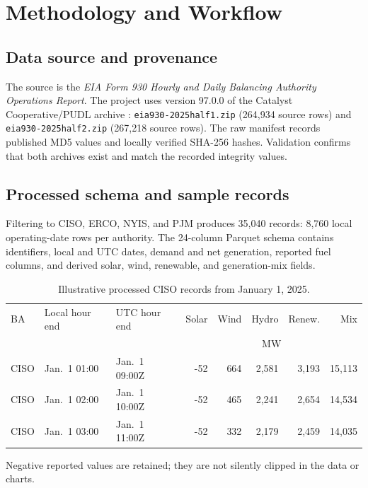 \documentclass[11pt]{article}
\begin{document}
\section{Methodology and Workflow}
\subsection{Data source and provenance}
The source is the \textit{EIA Form 930 Hourly and Daily Balancing Authority Operations Report}. The project uses version 97.0.0 of the Catalyst Cooperative/PUDL archive \citep{pudl-zenodo}: \texttt{eia930-2025half1.zip} (264,934 source rows) and \texttt{eia930-2025half2.zip} (267,218 source rows). The raw manifest records published MD5 values and locally verified SHA-256 hashes. Validation confirms that both archives exist and match the recorded integrity values.

\subsection{Processed schema and sample records}
Filtering to CISO, ERCO, NYIS, and PJM produces 35,040 records: 8,760 local operating-date rows per authority. The 24-column Parquet schema contains identifiers, local and UTC dates, demand and net generation, reported fuel columns, and derived solar, wind, renewable, and generation-mix fields.

\begin{table}[H]
\centering
\caption{Illustrative processed CISO records from January 1, 2025.}
\label{tab:samples}
\small
\begin{tabular}{l l l r r r r r}
\toprule
BA & Local hour end & UTC hour end & Solar & Wind & Hydro & Renew. & Mix \\
 & & & \multicolumn{5}{c}{MW} \\
\midrule
CISO & Jan.\ 1 01:00 & Jan.\ 1 09:00Z & -52 & 664 & 2,581 & 3,193 & 15,113 \\
CISO & Jan.\ 1 02:00 & Jan.\ 1 10:00Z & -52 & 465 & 2,241 & 2,654 & 14,534 \\
CISO & Jan.\ 1 03:00 & Jan.\ 1 11:00Z & -52 & 332 & 2,179 & 2,459 & 14,035 \\
\bottomrule
\end{tabular}
\end{table}

Negative reported values are retained; they are not silently clipped in the data or charts.
\end{document}
